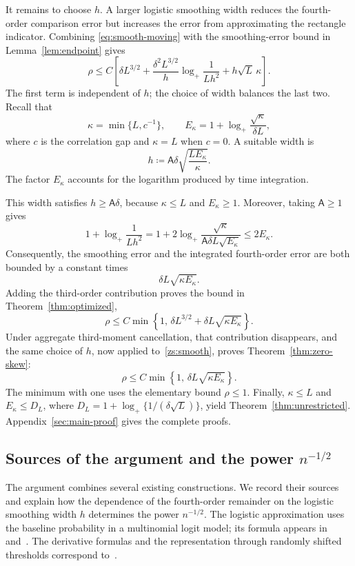 \documentclass[11pt,letterpaper]{article}
\theoremstyle{remark}
\begin{document}
It remains to choose \(h\). A larger logistic smoothing width reduces
the fourth-order comparison error but increases the error from
approximating the rectangle indicator. Combining
\eqref{eq:smooth-moving} with the smoothing-error bound in
Lemma~\ref{lem:endpoint} gives
\[
 \rho\le C\left[
 \delta L^{3/2}
 +\frac{\delta^2L^{3/2}}h\log_+\frac1{Lh^2}
 +h\sqrt L\,\kappa\right].
\]
The first term is independent of \(h\); the choice of width balances
the last two. Recall that
\[
 \kappa=\min\{L,c^{-1}\},
 \qquad E_\kappa=1+\log_+\frac{\sqrt\kappa}{\delta L},
\]
where \(c\) is the correlation gap and \(\kappa=L\) when \(c=0\).
A suitable width is
\begin{equation}
 h\coloneqq\mathsf A\delta\sqrt{\frac{LE_\kappa}{\kappa}}.
 \label{eq:optimal-scale}
\end{equation}
The factor \(E_\kappa\) accounts for the logarithm produced by time
integration.

This width satisfies \(h\ge\mathsf A\delta\), because
\(\kappa\le L\) and \(E_\kappa\ge1\). Moreover, taking
\(\mathsf A\ge1\) gives
\[
 1+\log_+\frac1{Lh^2}
 =1+2\log_+\frac{\sqrt\kappa}
     {\mathsf A\delta L\sqrt{E_\kappa}}
 \le2E_\kappa.
\]
Consequently, the smoothing error and the integrated fourth-order
error are both bounded by a constant times
\[
 \delta L\sqrt{\kappa E_\kappa}.
\]
Adding the third-order contribution proves the bound in
Theorem~\ref{thm:optimized},
\[
 \rho\le C\min\!\left\{1,\,
 \delta L^{3/2}+\delta L\sqrt{\kappa E_\kappa}\right\}.
\]
Under aggregate third-moment cancellation, that contribution
disappears, and the same choice of \(h\), now applied
to~\eqref{zs:smooth}, proves Theorem~\ref{thm:zero-skew}:
\[
 \rho\le C\min\!\left\{1,\,
 \delta L\sqrt{\kappa E_\kappa}\right\}.
\]
The minimum with one uses the elementary bound \(\rho\le1\).
Finally, \(\kappa\le L\) and \(E_\kappa\le D_L\), where
\(D_L=1+\log_+\{1/(\delta\sqrt L)\}\), yield
Theorem~\ref{thm:unrestricted}. Appendix~\ref{sec:main-proof}
gives the complete proofs.


\subsection{\texorpdfstring{Sources of the argument and the power \(n^{-1/2}\)}{Sources of the argument and the power n to the -1/2}}
\label{sec:why-rate}\label{sec:sources}

The argument combines several existing constructions. We record
their sources and explain how the dependence of the fourth-order
remainder on the logistic smoothing width \(h\) determines the power
\(n^{-1/2}\). The logistic approximation uses the baseline probability
in a multinomial logit model; its formula appears
in~\cite[p.~1001]{McFadden1989} and~\cite[equation~(5)]{GaoZhang}.
The derivative formulas and the representation through randomly
shifted thresholds correspond to~\cite[Lemmas~13 and~14]{GaoZhang}.
\end{document}

